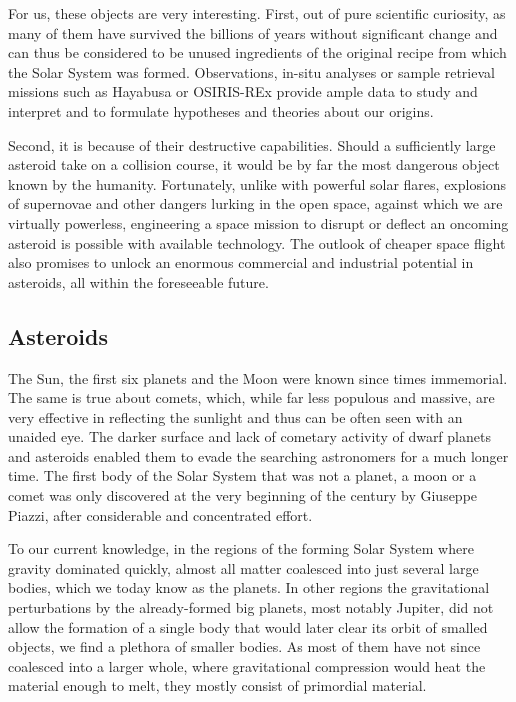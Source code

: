     For us, these objects are very interesting. First, out of pure scientific curiosity, as many of them
    have survived the billions of years without significant change and can thus be considered
    to be unused ingredients of the original recipe from which the Solar System was formed.
    Observations, in-situ analyses or sample retrieval missions such as Hayabusa or OSIRIS-REx
    provide ample data to study and interpret and to formulate hypotheses and theories about our origins.

    Second, it is because of their destructive capabilities.
    Should a sufficiently large asteroid take on a collision course, it would be by far the most dangerous object
    known by the humanity. Fortunately, unlike with powerful solar flares, explosions of supernovae and other
    dangers lurking in the open space, against which we are virtually powerless,
    engineering a space mission to disrupt or deflect an oncoming asteroid is possible with available technology.
    The outlook of cheaper space flight also promises to unlock an enormous commercial and industrial potential in asteroids,
    all within the foreseeable future.

    \subsection{Asteroids} \label{iaa}
        The Sun, the first six planets and the Moon were known since times immemorial.
        The same is true about comets, which, while far less populous and massive,
        are very effective in reflecting the sunlight and thus can be often seen with an unaided eye.
        The darker surface and lack of cometary activity of dwarf planets and asteroids enabled them
        to evade the searching astronomers for a much longer time.
        The first body of the Solar System that was not a planet, a moon or a comet was only discovered at
        the very beginning of the  century by Giuseppe Piazzi, after considerable and concentrated effort.

        To our current knowledge, in the regions of the forming Solar System where gravity dominated quickly,
        almost all matter coalesced into just several large bodies, which we today know as the planets.
        In other regions the gravitational perturbations by the already-formed big planets, most notably Jupiter,
        did not allow the formation of a single body that would later clear its orbit of smalled objects,
        we find a plethora of smaller bodies. As most of them have not since coalesced into a larger whole,
        where gravitational compression would heat the material enough to melt, they mostly consist of primordial material.

